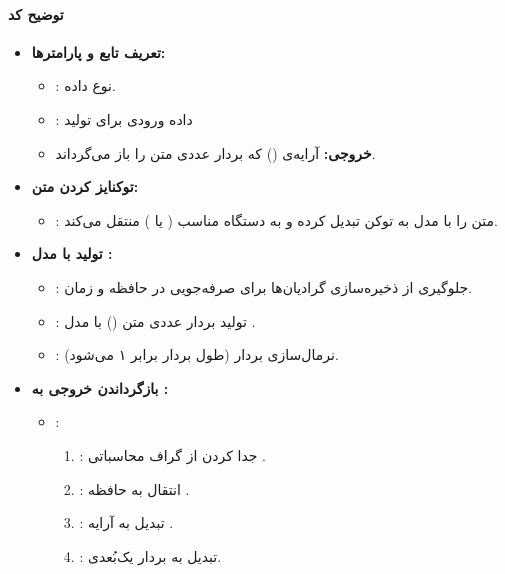 \documentclass{article}
\begin{document}
\paragraph{توضیح کد }
\begin{itemize}
    \item \textbf{تعریف تابع و پارامترها:}
    \begin{itemize}
        \item {}: نوع داده.
        \item {}: داده ورودی برای تولید  
        \item \textbf{خروجی:} آرایه‌ی  () که بردار عددی متن را باز می‌گرداند.
    \end{itemize}

    \item \textbf{توکنایز کردن متن:}
    \begin{itemize}
        \item {}: متن را با  مدل  به توکن تبدیل کرده و به دستگاه مناسب ( یا ) منتقل می‌کند.
    \end{itemize}

    \item \textbf{تولید  با مدل :}
    \begin{itemize}
        \item {}: جلوگیری از ذخیره‌سازی گرادیان‌ها برای صرفه‌جویی در حافظه و زمان.
        \item {}: تولید بردار عددی متن () با مدل .
        \item {}: نرمال‌سازی بردار (طول بردار برابر ۱ می‌شود).
    \end{itemize}

    \item \textbf{بازگرداندن خروجی به :}
    \begin{itemize}
        \item {}:
        \begin{enumerate}
            \item {}: جدا کردن از گراف محاسباتی .
            \item {}: انتقال به حافظه .
            \item {}: تبدیل به آرایه .
            \item {}: تبدیل به بردار یک‌بُعدی.
        \end{enumerate}
    \end{itemize}
\end{itemize}
\end{document}
